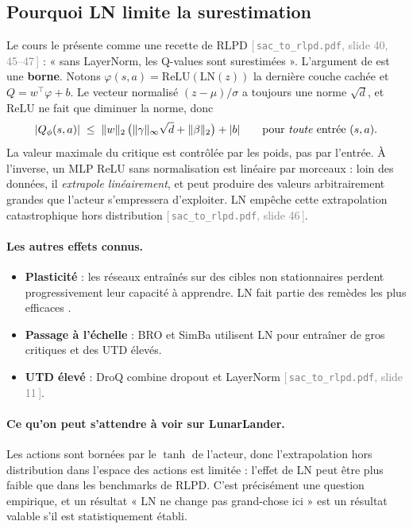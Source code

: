 \documentclass[11pt,a4paper]{article}
\newcommand{\code}[1]{\texttt{#1}}
\newcommand{\slide}[2]{\textcolor{gray}{[\,\code{#1}, slide #2\,]}}
\begin{document}
\subsection{Pourquoi LN limite la surestimation}
Le cours le présente comme une recette de RLPD \slide{sac\_to\_rlpd.pdf}{40, 45--47} : « sans
LayerNorm, les Q-values sont surestimées ». L'argument de \citet{ball2023rlpd} est une
\textbf{borne}. Notons $\varphi(s,a) = \mathrm{ReLU}(\mathrm{LN}(z))$ la dernière couche cachée et
$Q = w^\top\varphi + b$. Le vecteur normalisé $(z-\mu)/\sigma$ a toujours une norme $\sqrt d$, et
ReLU ne fait que diminuer la norme, donc
\begin{equation}
  |Q_\phi(s,a)| \;\le\; \|w\|_2\,\big(\|\gamma\|_\infty\sqrt d + \|\beta\|_2\big) + |b|
  \qquad\text{pour \emph{toute} entrée }(s,a).
\end{equation}
La valeur maximale du critique est contrôlée par les poids, pas par l'entrée. À l'inverse, un MLP
ReLU sans normalisation est linéaire par morceaux : loin des données, il \emph{extrapole
linéairement}, et peut produire des valeurs arbitrairement grandes que l'acteur s'empressera
d'exploiter. LN empêche cette extrapolation catastrophique hors distribution
\slide{sac\_to\_rlpd.pdf}{46}.

\paragraph{Les autres effets connus.}
\begin{itemize}
  \item \textbf{Plasticité} : les réseaux entraînés sur des cibles non stationnaires perdent
    progressivement leur capacité à apprendre. LN fait partie des remèdes les plus efficaces
    \citep{lyle2024plasticity}.
  \item \textbf{Passage à l'échelle} : BRO \citep{nauman2024bro} et SimBa \citep{lee2025simba}
    utilisent LN pour entraîner de gros critiques et des UTD élevés.
  \item \textbf{UTD élevé} : DroQ \citep{hiraoka2022droq} combine dropout et LayerNorm
    \slide{sac\_to\_rlpd.pdf}{11}.
\end{itemize}

\paragraph{Ce qu'on peut s'attendre à voir sur LunarLander.} Les actions sont bornées par le
$\tanh$ de l'acteur, donc l'extrapolation hors distribution dans l'espace des actions est limitée :
l'effet de LN peut être plus faible que dans les benchmarks de RLPD. C'est précisément une question
empirique, et un résultat « LN ne change pas grand-chose ici » est un résultat valable s'il est
statistiquement établi.
\end{document}
